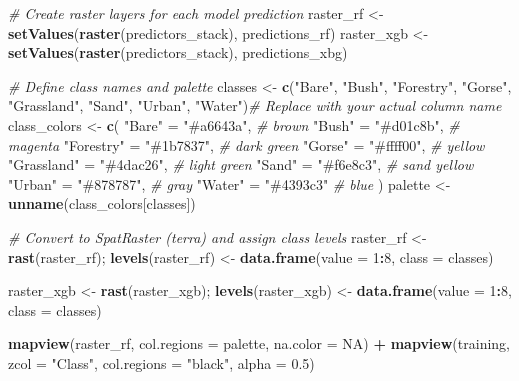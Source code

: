 \documentclass[
]{article}
\newenvironment{Shaded}{\begin{snugshade}}{\end{snugshade}}
\newcommand{\AttributeTok}[1]{\textcolor[rgb]{0.13,0.29,0.53}{#1}}
\newcommand{\CommentTok}[1]{\textcolor[rgb]{0.56,0.35,0.01}{\textit{#1}}}
\newcommand{\ConstantTok}[1]{\textcolor[rgb]{0.56,0.35,0.01}{#1}}
\newcommand{\DecValTok}[1]{\textcolor[rgb]{0.00,0.00,0.81}{#1}}
\newcommand{\FloatTok}[1]{\textcolor[rgb]{0.00,0.00,0.81}{#1}}
\newcommand{\FunctionTok}[1]{\textcolor[rgb]{0.13,0.29,0.53}{\textbf{#1}}}
\newcommand{\NormalTok}[1]{#1}
\newcommand{\OtherTok}[1]{\textcolor[rgb]{0.56,0.35,0.01}{#1}}
\newcommand{\SpecialCharTok}[1]{\textcolor[rgb]{0.81,0.36,0.00}{\textbf{#1}}}
\newcommand{\StringTok}[1]{\textcolor[rgb]{0.31,0.60,0.02}{#1}}
\begin{document}
\begin{Shaded}
\begin{Highlighting}[]
\CommentTok{\# Create raster layers for each model prediction}
\NormalTok{raster\_rf  }\OtherTok{\textless{}{-}} \FunctionTok{setValues}\NormalTok{(}\FunctionTok{raster}\NormalTok{(predictors\_stack), predictions\_rf)}
\NormalTok{raster\_xgb }\OtherTok{\textless{}{-}} \FunctionTok{setValues}\NormalTok{(}\FunctionTok{raster}\NormalTok{(predictors\_stack), predictions\_xbg)}

\CommentTok{\# Define class names and palette}
\NormalTok{classes }\OtherTok{\textless{}{-}} \FunctionTok{c}\NormalTok{(}\StringTok{"Bare"}\NormalTok{, }\StringTok{"Bush"}\NormalTok{, }\StringTok{"Forestry"}\NormalTok{, }\StringTok{"Gorse"}\NormalTok{, }\StringTok{"Grassland"}\NormalTok{, }\StringTok{"Sand"}\NormalTok{, }\StringTok{"Urban"}\NormalTok{, }\StringTok{"Water"}\NormalTok{)}\CommentTok{\# Replace with your actual column name}
\NormalTok{class\_colors }\OtherTok{\textless{}{-}} \FunctionTok{c}\NormalTok{(}
  \StringTok{"Bare"}       \OtherTok{=} \StringTok{"\#a6643a"}\NormalTok{,   }\CommentTok{\# brown}
  \StringTok{"Bush"}       \OtherTok{=} \StringTok{"\#d01c8b"}\NormalTok{,   }\CommentTok{\# magenta}
  \StringTok{"Forestry"}   \OtherTok{=} \StringTok{"\#1b7837"}\NormalTok{,   }\CommentTok{\# dark green}
  \StringTok{"Gorse"}      \OtherTok{=} \StringTok{"\#ffff00"}\NormalTok{,   }\CommentTok{\# yellow}
  \StringTok{"Grassland"}  \OtherTok{=} \StringTok{"\#4dac26"}\NormalTok{,   }\CommentTok{\# light green}
  \StringTok{"Sand"}       \OtherTok{=} \StringTok{"\#f6e8c3"}\NormalTok{,   }\CommentTok{\# sand yellow}
  \StringTok{"Urban"}      \OtherTok{=} \StringTok{"\#878787"}\NormalTok{,   }\CommentTok{\# gray}
  \StringTok{"Water"}      \OtherTok{=} \StringTok{"\#4393c3"}    \CommentTok{\# blue}
\NormalTok{)}
\NormalTok{palette }\OtherTok{\textless{}{-}} \FunctionTok{unname}\NormalTok{(class\_colors[classes])}

\CommentTok{\# Convert to SpatRaster (terra) and assign class levels}
\NormalTok{raster\_rf  }\OtherTok{\textless{}{-}} \FunctionTok{rast}\NormalTok{(raster\_rf);  }\FunctionTok{levels}\NormalTok{(raster\_rf)  }\OtherTok{\textless{}{-}} \FunctionTok{data.frame}\NormalTok{(}\AttributeTok{value =} \DecValTok{1}\SpecialCharTok{:}\DecValTok{8}\NormalTok{, }\AttributeTok{class =}\NormalTok{ classes)}

\NormalTok{raster\_xgb }\OtherTok{\textless{}{-}} \FunctionTok{rast}\NormalTok{(raster\_xgb); }\FunctionTok{levels}\NormalTok{(raster\_xgb) }\OtherTok{\textless{}{-}} \FunctionTok{data.frame}\NormalTok{(}\AttributeTok{value =} \DecValTok{1}\SpecialCharTok{:}\DecValTok{8}\NormalTok{, }\AttributeTok{class =}\NormalTok{ classes)}

\FunctionTok{mapview}\NormalTok{(raster\_rf, }\AttributeTok{col.regions =}\NormalTok{ palette, }\AttributeTok{na.color =} \ConstantTok{NA}\NormalTok{) }\SpecialCharTok{+} 
  \FunctionTok{mapview}\NormalTok{(training, }\AttributeTok{zcol =} \StringTok{"Class"}\NormalTok{, }\AttributeTok{col.regions =} \StringTok{"black"}\NormalTok{, }\AttributeTok{alpha =} \FloatTok{0.5}\NormalTok{)}
\end{Highlighting}
\end{Shaded}
\end{document}
